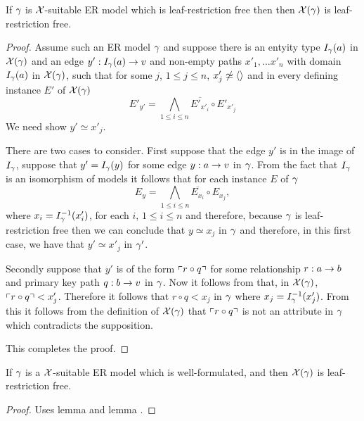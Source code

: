 \begin{lemma}
If $\gamma$ is $\mathcal{X}$-suitable ER model which is leaf-restriction free then
then $\mathcal{X}(\gamma)$ is leaf-restriction free.
\end{lemma}
\begin{proof}
Assume such an ER model $\gamma$ and suppose there is an entyity type $I_\gamma(a)$ in $\mathcal{X}(\gamma)$ and an edge $y': I_\gamma(a) \rightarrow v$ and non-empty paths $x'_1,...x'_n$   with domain $I_\gamma(a)$ in $\mathcal{X}(\gamma)$,  such that for some $j$, $1 \leq j \leq n$, $x'_j \not\simeq \langle\rangle$ and in every defining instance $E'$ of $\mathcal{X}(\gamma)$  
\begin{equation}
\label{restrictioninchimodel}
E'_{y'} = \bigwedge_{1 \leq i \leq n}{\overline{E'_{x'_i}}} \circ E'_{x'_j}
\end{equation}
We need show  $y' \simeq x'_j$.

There are two cases to consider. First suppose that the edge $y'$ is in the image of $I_\gamma$, suppose that $y'=I_\gamma(y)$ for some edge
$y:a \rightarrow v$ in $\gamma$. From the fact that $I_\gamma$ is an isomorphism of models it follows that for each instance $E$ of  $\gamma$
$$E_{y} = \bigwedge_{1 \leq i \leq n}{\overline{E_{x_i}}} \circ E_{x_j},$$
where $x_i=I^{-1}_\gamma(x'_i)$, for each $i$, $1 \leq i \leq n$ and therefore, because $\gamma$ is leaf-restriction free then we can conclude that
$y \simeq x_j$ in $\gamma$ and therefore, in this first case, we have that $y' \simeq x'_j$ in $\gamma'$.


Secondly suppose that $y'$ is of the form $\left\ulcorner r \circ q\right\urcorner$ for some relationship $r: a \rightarrow b$ and primary key path $q :b \rightarrow v$ in $\gamma$.
Now it follows from  that, in $\mathcal{X}(\gamma)$, $\left\ulcorner r \circ q\right\urcorner < x'_j$. Therefore  
it follows that $r \circ q < x_j$ in $\gamma$  where $x_j= I^{-1}_\gamma(x'_j)$. From this it follows from the definition of $\mathcal{X}(\gamma)$ that
 $\left\ulcorner r \circ q\right\urcorner$ is not an attribute in $\gamma$ which contradicts the supposition. 

This completes the proof.
\end{proof}

\begin{oldtt}
\begin{lemma}
If $\gamma$ is a $\mathcal{X}$-suitable ER model which is well-formulated,  and   then $\mathcal{X}(\gamma)$ is leaf-restriction free.
\end{lemma}
\begin{proof}
Uses lemma   and lemma . 
\vspace{0.5cm}
\end{proof}
\end{oldtt}

